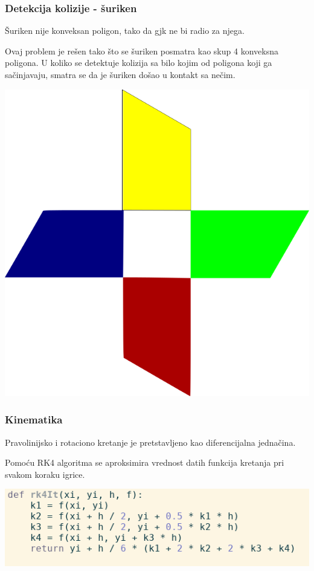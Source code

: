 \documentclass{beamer}
\begin{document}
\begin{frame}
	\frametitle{Detekcija kolizije - šuriken}
	Šuriken nije konveksan poligon, tako da gjk ne bi radio za njega.

	Ovaj problem je rešen tako što se šuriken posmatra kao skup 4 konveksna poligona. U koliko se detektuje kolizija sa bilo kojim od poligona koji ga sačinjavaju, smatra se da je šuriken došao u kontakt sa nečim.
	
	\vspace{0.4cm}
	\begin{center}
		\includegraphics[scale=0.3]{./images/shuriken.png}
	\end{center}
\end{frame}

\begin{frame}
	\frametitle{Kinematika}
	Pravolinijsko i rotaciono kretanje je pretstavljeno kao diferencijalna jednačina.
	
	Pomoću RK4 algoritma se aproksimira vrednost datih funkcija kretanja pri svakom koraku igrice.
	
	\vspace{0.8cm}
	\begin{center}
		\includegraphics[scale=0.5]{./images/rk4.png}
	\end{center}
\end{frame}
\end{document}
